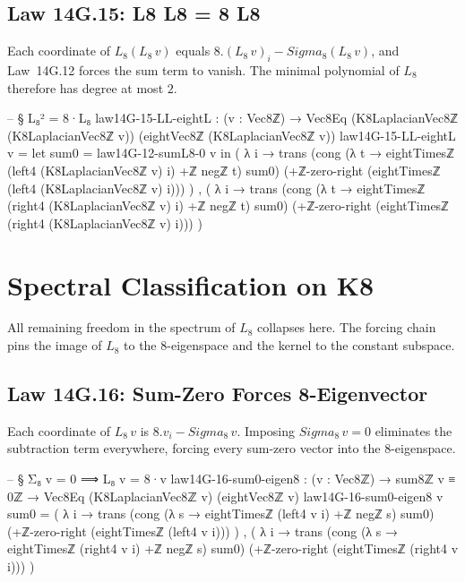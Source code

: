 \documentclass[11pt,a4paper]{book}
\def\Sigma{Sigma}%
\def\circ{o}%
\def\cdot{.}%
\def\texorpdfstring#1#2{#2}%
\begin{document}
\subsection{Law 14G.15: \texorpdfstring{$L_8 \circ L_8 = 8 \cdot L_8$}{L8 L8 = 8 L8}}

Each coordinate of $L_8 (L_8\,v)$ equals $8 \cdot (L_8\,v)_i - \Sigma_8 (L_8\,v)$, and Law~14G.12 forces the sum term to vanish. The minimal polynomial of $L_8$ therefore has degree at most $2$.

\begin{code}
-- § L₈² = 8·L₈
law14G-15-LL-eightL : (v : Vec8ℤ) → Vec8Eq (K8LaplacianVec8ℤ (K8LaplacianVec8ℤ v)) (eightVec8ℤ (K8LaplacianVec8ℤ v))
law14G-15-LL-eightL v =
  let sum0 = law14G-12-sumL8-0 v in
  ( λ i →
      trans
        (cong (λ t → eightTimesℤ (left4 (K8LaplacianVec8ℤ v) i) +ℤ negℤ t) sum0)
        (+ℤ-zero-right (eightTimesℤ (left4 (K8LaplacianVec8ℤ v) i)))
  ) ,
  ( λ i →
      trans
        (cong (λ t → eightTimesℤ (right4 (K8LaplacianVec8ℤ v) i) +ℤ negℤ t) sum0)
        (+ℤ-zero-right (eightTimesℤ (right4 (K8LaplacianVec8ℤ v) i)))
  )
\end{code}

\section{Spectral Classification on K\texorpdfstring{$_8$}{8}}

All remaining freedom in the spectrum of $L_8$ collapses here.
The forcing chain pins the image of $L_8$ to the $8$-eigenspace and the kernel to the constant subspace.

\subsection{Law 14G.16: Sum-Zero Forces 8-Eigenvector}

Each coordinate of $L_8\,v$ is $8 \cdot v_i - \Sigma_8\,v$. Imposing $\Sigma_8\,v = 0$ eliminates the subtraction term everywhere, forcing every sum-zero vector into the $8$-eigenspace.

\begin{code}
-- § Σ₈ v = 0 ⟹ L₈ v = 8·v
law14G-16-sum0-eigen8 : (v : Vec8ℤ) → sum8ℤ v ≡ 0ℤ → Vec8Eq (K8LaplacianVec8ℤ v) (eightVec8ℤ v)
law14G-16-sum0-eigen8 v sum0 =
  ( λ i →
      trans
        (cong (λ s → eightTimesℤ (left4 v i) +ℤ negℤ s) sum0)
        (+ℤ-zero-right (eightTimesℤ (left4 v i)))
  ) ,
  ( λ i →
      trans
        (cong (λ s → eightTimesℤ (right4 v i) +ℤ negℤ s) sum0)
        (+ℤ-zero-right (eightTimesℤ (right4 v i)))
  )
\end{code}
\end{document}
